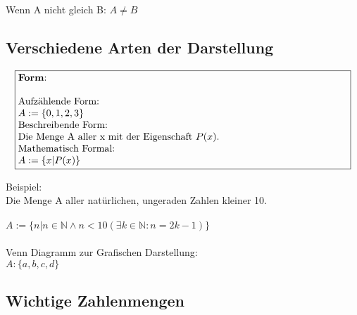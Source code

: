 \documentclass[../gruppenarbeit_1.tex]{subfiles}
\begin{document}
Wenn A nicht gleich B: $A \ne B$

\newpage

\subsection{Verschiedene Arten der Darstellung}

\begin{align}
    \fbox{\begin{minipage}{11.8cm}
      \textbf{Form}:\\
      \\
      Aufzählende Form:\\
      $A := \{0,1,2,3\}$\\
      Beschreibende Form:\\
      Die Menge A aller x mit der Eigenschaft $P(x)$.\\
      Mathematisch Formal:\\
      $A := \{x | P(x)\}$
    \end{minipage}}
\end{align}

Beispiel:\\
Die Menge A aller natürlichen, ungeraden Zahlen kleiner 10.\\
\\
$A := \{n | n \in \mathbb{N} \wedge n < 10 (\exists k \in \mathbb{N} : n = 2k-1)\}$\\
\\

Venn Diagramm zur Grafischen Darstellung:\\
$A : \{a,b,c,d\}$\\


\subsection{Wichtige Zahlenmengen}
\end{document}
